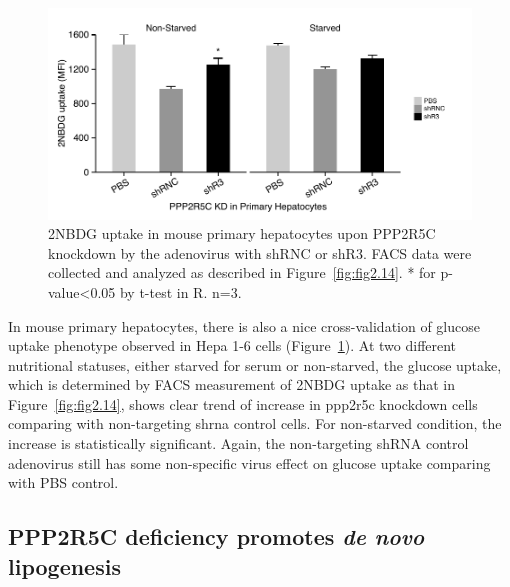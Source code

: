 \begin{figure}[htbp]
\centering
\includegraphics[width=1\textwidth]{figs/fig2-15 1st hepa glucose uptake facs.pdf}
\caption[2NBDG uptake in primary hepatocytes]{\footnotesize 2NBDG uptake in mouse primary hepatocytes upon PPP2R5C knockdown by the adenovirus with shRNC or shR3. FACS data were collected and analyzed as described in Figure~\ref{fig:fig2.14}. * for p-value<0.05 by t-test in R. n=3.}
\label{fig:fig2.15}
\end{figure}

In mouse primary hepatocytes, there is also a nice cross-validation of glucose uptake phenotype observed in Hepa 1-6 cells (Figure~\ref{fig:fig2.15}). At two different nutritional statuses, either starved for serum or non-starved, the glucose uptake, which is determined by FACS measurement of 2NBDG uptake as that in Figure~\ref{fig:fig2.14}, shows clear trend of increase in \gls{ppp2r5c} knockdown cells comparing with non-targeting \gls{shrna} control cells. For non-starved condition, the increase is statistically significant. Again, the non-targeting shRNA control adenovirus still has some non-specific virus effect on glucose uptake comparing with PBS control.

\subsection{PPP2R5C deficiency promotes \textit{de novo} lipogenesis}

